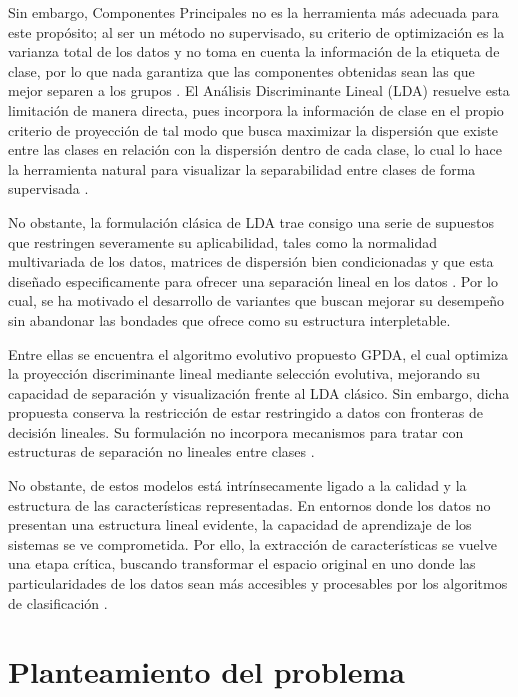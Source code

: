 Sin embargo, Componentes Principales no es la herramienta más adecuada para este propósito; al ser un método no supervisado, su criterio de optimización es la varianza total de los datos y no toma en cuenta la información de la etiqueta de clase, por lo que nada garantiza que las componentes obtenidas sean las que mejor separen a los grupos \cite{rabbi2025performance}. El Análisis Discriminante Lineal (LDA) resuelve esta limitación de manera directa, pues incorpora la información de clase en el propio criterio de proyección de tal modo que busca maximizar la dispersión que existe entre las clases en relación con la dispersión dentro de cada clase, lo cual lo hace la herramienta natural para visualizar la separabilidad entre clases de forma supervisada \cite{chhikara2022data}.

No obstante, la formulación clásica de LDA trae consigo una serie de supuestos que restringen severamente su aplicabilidad, tales como la normalidad multivariada de los datos, matrices de dispersión bien condicionadas y que esta diseñado especificamente para ofrecer una separación lineal en los datos \cite{feng2021comparison}. Por lo cual, se ha motivado el desarrollo de variantes que buscan mejorar su desempeño sin abandonar las bondades que ofrece como su estructura interpletable. 

Entre ellas se encuentra el algoritmo evolutivo propuesto GPDA, el cual optimiza la proyección discriminante lineal mediante selección evolutiva, mejorando su capacidad de separación y visualización frente al LDA clásico. 
Sin embargo, dicha propuesta conserva la restricción de estar restringido a datos con fronteras de decisión lineales. Su formulación no incorpora mecanismos para tratar con estructuras de separación no lineales entre clases \cite{medina2025genetic}.




No obstante, de estos modelos está intrínsecamente ligado a la calidad y la estructura de las características representadas. En entornos donde los datos no presentan una estructura lineal evidente, la capacidad de aprendizaje de los sistemas se ve comprometida. Por ello, la extracción de características se vuelve una etapa crítica, buscando transformar el espacio original en uno donde las particularidades de los datos sean más accesibles y procesables por los algoritmos de clasificación \cite{wani2025comprehensive}.





\section{Planteamiento del problema}

